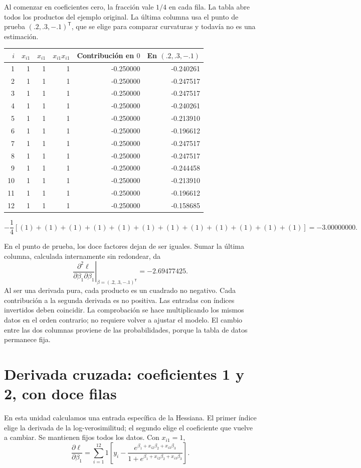 \documentclass[11pt,a4paper]{article}
\newcommand{\T}{^{\mathsf T}}
\begin{document}
Al comenzar en coeficientes cero, la fracción vale $1/4$ en cada fila.
La tabla abre todos los productos del ejemplo original. La última
columna usa el punto de prueba $(.2,.3,-.1)^\mathsf T$, que se elige
para comparar curvaturas y todavía no es una estimación.
\begin{center}\small
\begin{tabular}{rrrrrr}
\toprule
$i$&$x_{i1}$&$x_{i1}$&$x_{i1}x_{i1}$&Contribución en $0$&En $(.2,.3,-.1)$\\\midrule1&1&1&1&-0.250000&-0.240261\\
2&1&1&1&-0.250000&-0.247517\\
3&1&1&1&-0.250000&-0.247517\\
4&1&1&1&-0.250000&-0.240261\\
5&1&1&1&-0.250000&-0.213910\\
6&1&1&1&-0.250000&-0.196612\\
7&1&1&1&-0.250000&-0.247517\\
8&1&1&1&-0.250000&-0.247517\\
9&1&1&1&-0.250000&-0.244458\\
10&1&1&1&-0.250000&-0.213910\\
11&1&1&1&-0.250000&-0.196612\\
12&1&1&1&-0.250000&-0.158685\\\bottomrule\end{tabular}\end{center}\[
-\frac14\left[(1)+(1)+(1)+(1)+(1)+(1)+(1)+(1)+(1)+(1)+(1)+(1)\right]=-3.00000000.
\]

En el punto de prueba, los doce factores dejan de ser iguales.
Sumar la última columna, calculada internamente sin redondear, da
\[
\left.\frac{\partial^2\ell}{\partial\beta_1\partial\beta_1}\right|_{\beta=(.2,.3,-.1)\T}=-2.69477425.
\]
Al ser una derivada pura, cada producto es un cuadrado no negativo. Cada contribución a la segunda derivada es no positiva.
Las entradas con índices invertidos deben coincidir.
La comprobación se hace multiplicando los mismos datos en el orden
contrario; no requiere volver a ajustar el modelo.
El cambio entre las dos columnas proviene de las probabilidades,
porque la tabla de datos permanece fija.

\clearpage
\section{Derivada cruzada: coeficientes 1 y 2, con doce filas}\label{logit20}
En esta unidad calculamos una entrada específica de la Hessiana.
El primer índice elige la derivada de la log-verosimilitud; el segundo
elige el coeficiente que vuelve a cambiar.
Se mantienen fijos todos los datos. Con $x_{i1}=1$,
\[
\frac{\partial\ell}{\partial\beta_1}=\sum_{i=1}^{12}1\left[y_i-\frac{e^{\beta_1+x_{i2}\beta_2+x_{i3}\beta_3}}{1+e^{\beta_1+x_{i2}\beta_2+x_{i3}\beta_3}}\right].
\]
\end{document}
